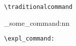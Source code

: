 \documentclass{article}
\newcommand{\packageoption}[1]{\texttt{\textcolor{black!67!green}{#1}}}
\begin{document}

\lstinline|\traditionalcommand|

\begin{code}
\mymodule_some_command:nn {} {}
\end{code}

\lstinline|\expl_command:|
\end{document}
